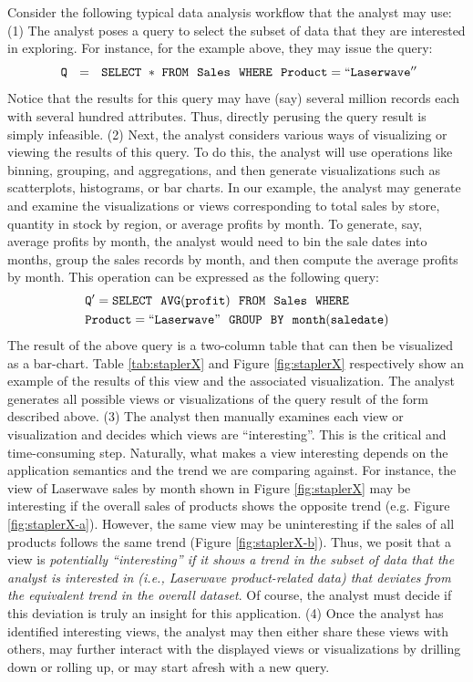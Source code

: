 Consider the following typical data analysis workflow
that the analyst may use:
(1) The analyst poses a query to select the subset of data 
that they are interested in exploring.
For instance, for the example above, they may issue the query:
\noindent 
$${\tt \ Q \ \ = \ \ SELECT \ * \ FROM \ \  Sales \ \ WHERE \ \ Product=``Laserwave''} $$
\noindent Notice that the results for this query 
may have (say) several million records each with several hundred attributes. 
Thus, directly perusing the query result is simply infeasible.
(2) Next, the analyst considers various ways of visualizing 
or viewing the results of this query. 
To do this, the analyst will use operations like binning, grouping,
and aggregations, and then generate visualizations such as
scatterplots, histograms, or bar charts.
In our example, the analyst may generate and examine the visualizations
or views corresponding to total sales by
store, quantity in stock by region, or average profits by month.
To generate, say, average profits by month, the analyst would need
to bin the sale dates into months, group the sales records by month,
and then compute the average profits by month.
This operation can be expressed as the following query:
\noindent 
\begin{align*}
& \tt Q' = SELECT \ \ AVG(profit) \ \ FROM \ \  Sales \ \ WHERE \\
& \tt Product=``Laserwave" \ \ GROUP  \ \ BY \ \ month(saledate)
\end{align*}
The result of the above query is a two-column table that can then be visualized
as a bar-chart. Table \ref{tab:staplerX} and Figure
\ref{fig:staplerX} respectively show an example of the results of this view and
the associated visualization.
The analyst generates all possible views or visualizations of the query result
of the form described above.
(3) The analyst then manually examines each view or visualization and decides
which views are ``interesting''.
This is the critical and time-consuming step.
Naturally, what makes a view interesting depends on the 
application semantics and the trend we are comparing against.
For instance, the view of Laserwave sales by month shown in Figure
\ref{fig:staplerX} may be interesting if the overall sales of products shows the
opposite trend (e.g. Figure \ref{fig:staplerX-a}).
However, the same view may be uninteresting if the sales of all products follows
the same trend (Figure \ref{fig:staplerX-b}). 
Thus, we posit that  a view is {\em potentially ``interesting'' if it shows 
a trend in the subset of data that the analyst is interested in 
(i.e., Laserwave product-related data)
that deviates from the equivalent trend in the overall dataset}.
Of course, the analyst must decide if this deviation 
is truly an insight for this application.
(4) Once the analyst has identified interesting views, the analyst may
then either share these views with others, may further interact with
the displayed views or visualizations by drilling down or rolling up, or
may start afresh with a new query.


